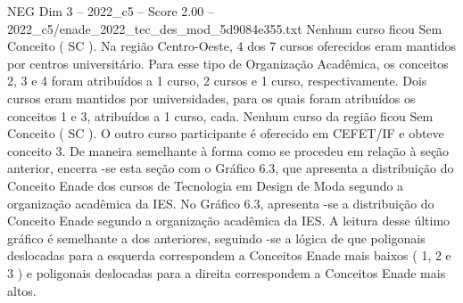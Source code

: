 \begin{textsample}{NEG Dim 3 – 2022\_c5 – Score 2.00 – 2022\_c5/enade\_2022\_tec\_des\_mod\_5d9084e355.txt}
Nenhum curso ficou Sem Conceito ( SC ).
Na região Centro-Oeste, 4 dos 7 cursos oferecidos eram mantidos por centros universitário.
Para esse tipo de Organização Acadêmica, os conceitos 2, 3 e 4 foram atribuídos a 1 curso, 2 cursos e 1 curso, respectivamente.
Dois cursos eram mantidos por universidades, para os quais foram atribuídos os conceitos 1 e 3, atribuídos a 1 curso, cada.
Nenhum curso da região ficou Sem Conceito ( SC ).
O outro curso participante é oferecido em CEFET/IF e obteve conceito 3.
De maneira semelhante à forma como se procedeu em relação à seção anterior, encerra -se esta seção com o Gráfico 6.3, que apresenta a distribuição do Conceito Enade dos cursos de Tecnologia em Design de Moda segundo a organização acadêmica da IES.
No Gráfico 6.3, apresenta -se a distribuição do Conceito Enade segundo a organização acadêmica da IES.
A leitura desse último gráfico é semelhante a dos anteriores, seguindo -se a lógica de que poligonais deslocadas para a esquerda correspondem a Conceitos Enade mais baixos ( 1, 2 e 3 ) e poligonais deslocadas para a direita correspondem a Conceitos Enade mais altos.

\end{textsample}
